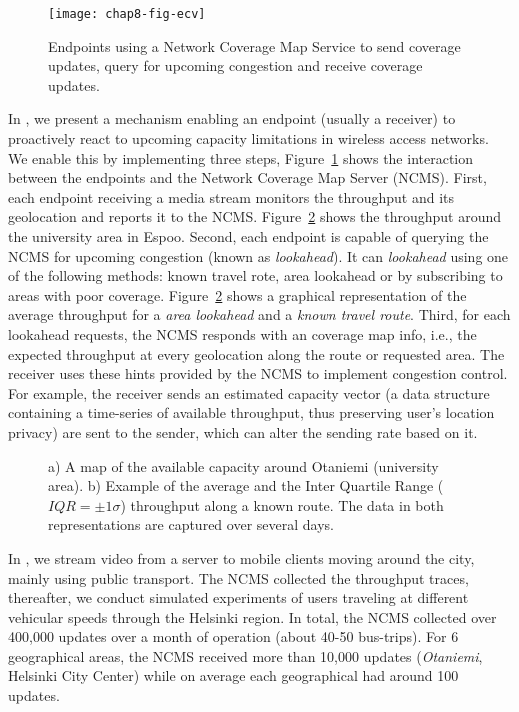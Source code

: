 \begin{figure}
\texttt{[image: chap8-fig-ecv]}
  \caption{Endpoints using a Network Coverage Map Service to send coverage
  updates, query for upcoming congestion and receive coverage updates.}
\label{fig:cc:ecv}
\end{figure}


In , we present a mechanism enabling an endpoint (usually a
receiver) to proactively react to upcoming capacity limitations in wireless
access networks. We enable this by implementing three steps,
Figure~\ref{fig:cc:ecv} shows the interaction between the endpoints and the
Network Coverage Map Server (NCMS). First, each endpoint receiving a media
stream monitors the throughput and its geolocation and reports it to the NCMS.
Figure~\ref{fig:glass:map} shows the throughput around the university area in
Espoo. Second, each endpoint is capable of querying the NCMS for upcoming
congestion (known as \emph{lookahead}). It can \emph{lookahead} using one of
the following methods: known travel rote, area lookahead or by subscribing to
areas with poor coverage. Figure~\ref{fig:glass:map} shows a graphical
representation of the average throughput for a \emph{area lookahead} and a
\emph{known travel route}. Third, for each lookahead requests, the NCMS
responds with an coverage map info, i.e., the expected throughput at every
geolocation along the route or requested area. The receiver uses these hints
provided by the NCMS to implement congestion control. For example, the
receiver sends an estimated capacity vector (a data structure containing a
time-series of available throughput, thus preserving user's location privacy)
are sent to the sender, which can alter the sending rate based on it.

\begin{figure}
  \centerline{
  }
  \centerline{
  }
  \caption{a) A map of the available capacity around Otaniemi (university
  area). b) Example of the average and the Inter Quartile Range
  ($IQR=\pm1\sigma$) throughput along a known route. The data in both
  representations are captured over several days.}
  \label{fig:glass:map}
\end{figure}

In , we stream video from a server to mobile clients moving
around the city, mainly using public transport. The NCMS collected the
throughput traces, thereafter, we conduct simulated experiments of users
traveling at different vehicular speeds through the Helsinki region. In total,
the NCMS collected over 400,000 updates over a month of operation (about 40-50
bus-trips). For 6 geographical areas, the NCMS received more than 10,000
updates (\emph{Otaniemi}, Helsinki City Center) while on average each
geographical had around 100 updates.

